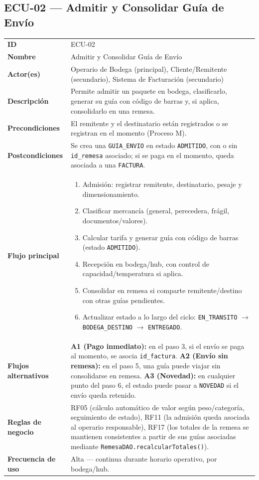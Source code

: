 \documentclass[11pt,a4paper]{article}
\begin{document}
\subsection{ECU-02 --- Admitir y Consolidar Guía de Envío}

{
\begin{longtable}{L{3.2cm} L{11.3cm}}
\toprule
\textbf{ID} & ECU-02 \\
\textbf{Nombre} & Admitir y Consolidar Guía de Envío \\
\textbf{Actor(es)} & Operario de Bodega (principal), Cliente/Remitente (secundario), Sistema de Facturación (secundario) \\
\textbf{Descripción} & Permite admitir un paquete en bodega, clasificarlo, generar su guía con código de barras y, si aplica, consolidarlo en una remesa. \\
\textbf{Precondiciones} & El remitente y el destinatario están registrados o se registran en el momento (Proceso M). \\
\textbf{Postcondiciones} & Se crea una \texttt{GUIA_ENVIO} en estado \texttt{ADMITIDO}, con o sin \texttt{id_remesa} asociado; si se paga en el momento, queda asociada a una \texttt{FACTURA}. \\
\textbf{Flujo principal} &
\begin{enumerate}[nosep,leftmargin=*]
  \item Admisión: registrar remitente, destinatario, pesaje y dimensionamiento.
  \item Clasificar mercancía (general, perecedera, frágil, documentos/valores).
  \item Calcular tarifa y generar guía con código de barras (estado \texttt{ADMITIDO}).
  \item Recepción en bodega/hub, con control de capacidad/temperatura si aplica.
  \item Consolidar en remesa si comparte remitente/destino con otras guías pendientes.
  \item Actualizar estado a lo largo del ciclo: \texttt{EN_TRANSITO} $\rightarrow$ \texttt{BODEGA_DESTINO} $\rightarrow$ \texttt{ENTREGADO}.
\end{enumerate} \\
\textbf{Flujos alternativos} &
\textbf{A1 (Pago inmediato):} en el paso 3, si el envío se paga al momento, se asocia \texttt{id_factura}.\newline
\textbf{A2 (Envío sin remesa):} en el paso 5, una guía puede viajar sin consolidarse en remesa.\newline
\textbf{A3 (Novedad):} en cualquier punto del paso 6, el estado puede pasar a \texttt{NOVEDAD} si el envío queda retenido. \\
\textbf{Reglas de negocio} & RF05 (cálculo automático de valor según peso/categoría, seguimiento de estado), RF11 (la admisión queda asociada al operario responsable), RF17 (los totales de la remesa se mantienen consistentes a partir de sus guías asociadas mediante \texttt{RemesaDAO.recalcularTotales()}). \\
\textbf{Frecuencia de uso} & Alta --- continua durante horario operativo, por bodega/hub. \\
\bottomrule
\end{longtable}
}
\end{document}
